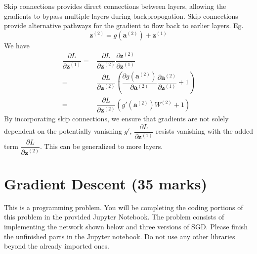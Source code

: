 \documentclass[12pt]{article}
\begin{document}
\begin{enumerate}[font=\Large]
\begin{enumerate}[label=(\alph*)]
		            Skip connections provides direct connections between layers, allowing the gradients to bypass multiple layers during backpropogation. Skip connections provide alternative pathways for the gradient to flow back to earlier layers. Eg.
		            $$\textbf{z}^{(2)} = g(\textbf{a}^{(2)}) + \textbf{z}^{(1)}$$
		            We have
		            $$
			            \begin{aligned}
				            \dfrac{\partial L}{\partial \textbf{z}^{(1)}}= & \dfrac{\partial L}{\partial \textbf{z}^{(2)}}\dfrac{\partial \textbf{z}^{(2)}}{\partial \textbf{z}^{(1)}}                                                                               \\
				            =                                              & \dfrac{\partial L}{\partial \textbf{z}^{(2)}}\left(\dfrac{\partial g(\textbf{a}^{(2)})}{\partial \textbf{a}^{(2)}}\dfrac{\partial \textbf{a}^{(2)}}{\partial \textbf{z}^{(1)}}+1\right) \\
				            =                                              & \dfrac{\partial L}{\partial \textbf{z}^{(2)}}(g'(\textbf{a}^{(2)})W^{(2)}+1)
			            \end{aligned}
		            $$
		            By incorporating skip connections, we ensure that gradients are not solely dependent on the potentially vanishing $g'$, $\dfrac{\partial L}{\partial \textbf{z}^{(1)}}$ resists vanishing with the added term $\dfrac{\partial L}{\partial \textbf{z}^{(2)}}$. This can be generalized to more layers.
	      \end{enumerate}
\end{enumerate}

\newpage
\section{Gradient Descent (35 marks)}
This is a programming problem. You will be completing the coding portions of this problem in the provided Jupyter Notebook. The problem consists of implementing the network shown below and three versions of SGD. Please finish the unfinished parts in the Jupyter notebook. Do not use any other libraries beyond the already imported ones.
\end{document}
